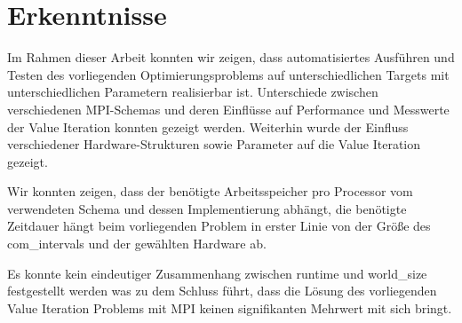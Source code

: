\section{Erkenntnisse}
\label{sec:erkenntnisse}
Im Rahmen dieser Arbeit konnten wir zeigen, dass automatisiertes Ausführen und Testen des vorliegenden Optimierungsproblems
auf unterschiedlichen Targets mit unterschiedlichen Parametern realisierbar ist.
Unterschiede zwischen verschiedenen MPI-Schemas und deren Einflüsse auf Performance und Messwerte der Value Iteration konnten gezeigt werden.
Weiterhin wurde der Einfluss verschiedener Hardware-Strukturen sowie Parameter auf die Value Iteration gezeigt.

Wir konnten zeigen, dass der benötigte Arbeitsspeicher pro Processor vom verwendeten Schema und dessen Implementierung abhängt,
die benötigte Zeitdauer hängt beim vorliegenden Problem in erster Linie von der Größe des com\_intervals und der gewählten Hardware ab.

Es konnte kein eindeutiger Zusammenhang zwischen runtime und world\_size festgestellt werden was zu dem Schluss führt, dass
die Lösung des vorliegenden Value Iteration Problems mit MPI keinen signifikanten Mehrwert mit sich bringt.